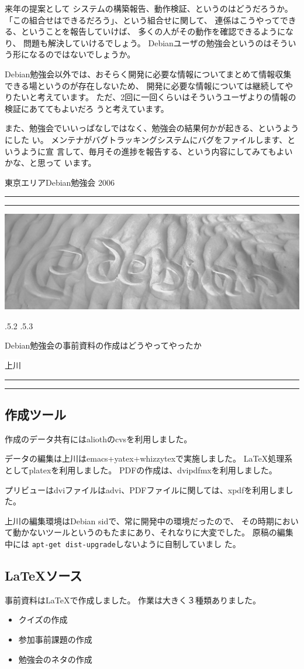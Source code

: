 \documentclass[mingoth,a4paper]{jsarticle}
\makeatletter
\renewcommand{\section}{\@startsection{section}{1}{\z@}%
    {\Cvs \@plus.5\Cdp \@minus.2\Cdp}%
    {.5\Cvs \@plus.3\Cdp}%
    {\normalfont\Huge\headfont\raggedright\centering}} %
\newcommand{\dancersection}[2]{%
\newpage
東京エリアDebian勉強会 2006
\hrule
\vspace{0.5mm}
\hrule
\hfill{}\includegraphics[width=16cm]{image2006-natsu/guruguru-sand-light.png}\\
\vspace{-5cm}
\begin{center}
\section{#1}
\end{center}
\hfill{}\colorbox{white}{#2}\hspace{3cm}\space\\
\vspace{1cm}
\hrule
\vspace{0.5mm}
\hrule
\vspace{1cm}
}
\makeatother
\begin{document}
来年の提案として
システムの構築報告、動作検証、というのはどうだろうか。
「この組合せはできるだろう」、という組合せに関して、
連係はこうやってできる、ということを報告していけば、
多くの人がその動作を確認できるようになり、
問題も解決していけるでしょう。
Debianユーザの勉強会というのはそういう形になるのではないでしょうか。

Debian勉強会以外では、おそらく開発に必要な情報についてまとめて情報収集できる場というのが存在しないため、
開発に必要な情報については継続してやりたいと考えています。
ただ、2回に一回くらいはそういうユーザよりの情報の検証にあててもよいだろ
うと考えています。

また、勉強会でいいっぱなしではなく、勉強会の結果何かが起きる、というようにした
い。
メンテナがバグトラッキングシステムにバグをファイルします、というように宣
言して、毎月その進捗を報告する、という内容にしてみてもよいかな、と思って
います。



\dancersection{Debian勉強会の事前資料の作成はどうやってやったか}{上川}

\subsection{作成ツール}

作成のデータ共有にはaliothのcvsを利用しました。

データの編集は上川はemacs+yatex+whizzytexで実施しました。
\LaTeX 処理系としてplatexを利用しました。
PDFの作成は、dvipdfmxを利用しました。

プリビューはdviファイルはadvi、PDFファイルに関しては、xpdfを利用しました。 

上川の編集環境はDebian sidで、常に開発中の環境だったので、
その時期において動かないツールというのもたまにあり、それなりに大変でした。
原稿の編集中には \texttt{apt-get dist-upgrade}しないように自制していまし
た。

\subsection{\LaTeX ソース}

事前資料は\LaTeX で作成しました。
作業は大きく３種類ありました。

\begin{itemize}
 \item クイズの作成
 \item 参加事前課題の作成
 \item 勉強会のネタの作成
\end{itemize}
\end{document}
